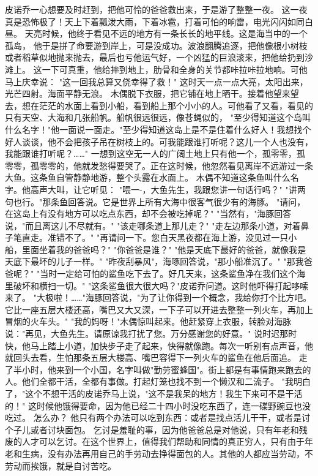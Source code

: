 \documentclass[12pt,UTF8]{ctexbook}
\begin{document}
皮诺乔一心想要及时赶到，把他可怜的爸爸救出来，于是游了整整一夜。
这一夜真是恐怖极了！天上下着瓢泼大雨，下着冰雹，打着可怕的响雷，电光闪闪如同白昼。
天亮时候，他终于看见不远的地方有一条长长的地平线。这是海当中的一个孤岛，
他于是拼了命要游到岸上，可是没成功。波浪翻腾追逐，把他像根小树枝或者稻草似地抛来抛去，最后也亏他运气好，一个凶猛的巨浪滚来，把他给扔到沙滩上。
这一下可真重，他给摔到地上，肋骨和全身的关节都咔拉咔拉地响。可他马上庆幸说：
"这一回我总算又侥幸得了救！"
这时天一点一点大亮，太阳出来，光芒四射。海面平静无浪。
木偶脱下衣服，把它铺在地上晒干。接着他望来望去，想在茫茫的水面上看到小船，看到船上那个小小的人。可他看了又看，看见的只有天空、大海和几张船帆。船帆很远很远，像苍蝇似的，
"至少得知道这个岛叫什么名字！"他一面说一面走。"至少得知道这岛上是不是住着什么好人！我想找个好人谈谈，他不会把孩子吊在树枝上的。可我能跟谁打听呢？这儿一个人也没有，我能跟谁打听呢？……"
一想到这空无一人的广阔土地上只有他一个，孤零零，孤零零，孤零零的，他就发愁得要哭了。正在这时候，他忽然看见离岸不远游过一条大鱼。这条鱼自管静静地游，整个头露在水面上。
木偶不知道这条鱼叫什么名字。他高声大叫，让它听见：
"喂一-，大鱼先生，我跟您讲一句话行吗？"
"讲两句也行。"那条鱼回答说。它是世界上所有大海中很客气很少有的海豚。
"请问，在这岛上有没有地方可以吃点东西，却不会被吃掉呢？"
"当然有，"海豚回答说，"而且离这儿不尽就有。"
"该走哪条道上那儿走？"
"走左边那条小道，对着鼻子笔直走。准错不了。"
"再请问一下。您白天黑夜都在海上游，没见过一只小船，里面坐着我的爸爸吗？"
"你爸爸是谁？"
"他是天底下最好的爸爸，就像我是天底下最坏的儿子一样。"
"昨夜刮暴风"，海啄回答说，"那小船准沉了。"
"那我爸爸呢？"
"当时一定给可怕的鲨鱼吃下去了。好几天来，这条鲨鱼净在我们这个海里破坏和横扫一切。"
"这条鲨鱼很大很大吗？"皮诺乔问道。这时他吓得打起哆嗦来了。
"大极啦！……"海豚回答说，"为了让你得到一个概念，我给你打个比方吧。它比一座五层大楼还高，嘴巴又大又深，一下子可以开进去整整一列火车，再加上冒烟的火车头。"
"我的妈呀！"木偶惊叫起来。他赶紧穿上衣服，转脸对海脉说："再见，大鱼先生。请原谅我打扰了您。万分感谢您的好意。"
说时迟那时快，他马上踏上小道，加快步子走了起来，快得就像跑。每次一听别有点声音，他就回头去看，生怕那条五层大楼高、嘴巴容得下一列火车的鲨鱼在他后面追。
走了半小时，他来到一个小国，名字叫做"勤劳蜜蜂国"。街上都是有事情跑来跑去的人。他们全都干活，全都有事做。打起灯笼也找不到一个懒汉和二流子。
"我明白了，"这个不想干活的皮诺乔马上说，"这不是我呆的地方！我生下来可不是干活的！"
这时候他饿得要命，因为他已经二十四小时没吃东西了，连一碟野豌豆也没吃过。
怎么办？
他只有两个办法可以吃到东西：或者是找点活儿干干，或者是讨个子儿或者讨块面包。
乞讨是羞耻的事，因为他爸爸总是对他说，只有年老和残废的人才可以乞讨。在这个世界上，值得我们帮助和同情的真正穷人，只有由于年老和生病，没有办法再用自己的手劳动去挣得面包的人。其他的人都应当劳动，不劳动而挨饿，就是自讨苦吃。
\end{document}
